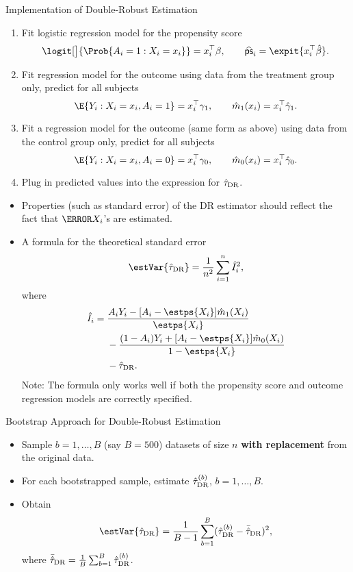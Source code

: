 \begin{Regular}{Implementation of Double-Robust Estimation}
      \begin{enumerate}[1.]
            \item Fit logistic regression model for the propensity score
                  \[ \logit[\big]{\Prob{A_i=1\given X_i=x_i}}=x_i^\top \beta,\qquad \widehat{\textsf{ps}}_i=\expit{x_i^\top \hat{\beta}}. \]
            \item Fit regression model for the outcome using data from the
                  treatment group only, predict for all subjects
                  \[ \E{Y_i\given X_i=x_i,A_i=1}=x_i^\top \gamma_1,\qquad \hat{m}_1(x_i)=x_i^\top\hat{\gamma}_1. \]
            \item Fit a regression model for the outcome (same form as above)
                  using data from the control group only, predict for all subjects
                  \[ \E{Y_i\given X_i=x_i,A_i=0}=x_i^\top \gamma_0,\qquad \hat{m}_0(x_i)=x_i^\top\hat{\gamma}_0. \]
            \item Plug in predicted values into the expression for $ \hat{\tau}_{\text{DR}} $.
      \end{enumerate}
\end{Regular}
\begin{itemize}
      \item Properties (such as standard error) of the DR estimator should
            reflect the fact that $ \ps{X_i} $'s are estimated.
      \item A formula for the theoretical standard error
            \[ \estVar{\hat{\tau}_{\DR}}=\frac{1}{n^2}\sum_{i=1}^{n}\hat{I}_i^2, \]
            where
            \begin{align*}
                  \hat{I}_i
                   & =\frac{A_i Y_i-[A_i-\estps{X_i}]\hat{m}_1(X_i)}{\estps{X_i}}                     \\
                   & \phantom{{}={}}-\frac{(1-A_i)Y_i+[A_i-\estps{X_i}]\hat{m}_0(X_i)}{1-\estps{X_i}} \\
                   & \phantom{{}={}}-\hat{\tau}_{\DR}.
            \end{align*}
            Note: The formula only works well if both the propensity score
            and outcome regression models are correctly specified.
\end{itemize}
\begin{Regular}{Bootstrap Approach for Double-Robust Estimation}
      \begin{itemize}
            \item Sample $ b=1,\ldots,B $ (say $ B=500 $) datasets of size $ n $ \textbf{with replacement}
                  from the original data.
            \item For each bootstrapped sample, estimate $ \hat{\tau}_{\text{DR}}^{(b)} $, $ b=1,\ldots,B $.
            \item Obtain
                  \[ \estVar{\hat{\tau}_{\DR}}=\frac{1}{B-1}\sum_{b=1}^{B}(\hat{\tau}_{\DR}^{(b)}-\bar{\hat{\tau}}_{\DR})^2, \]
                  where $ \bar{\hat{\tau}}_{\text{DR}}=\frac{1}{B}\sum_{b=1}^{B}\hat{\tau}_{\text{DR}}^{(b)} $.
      \end{itemize}
\end{Regular}
